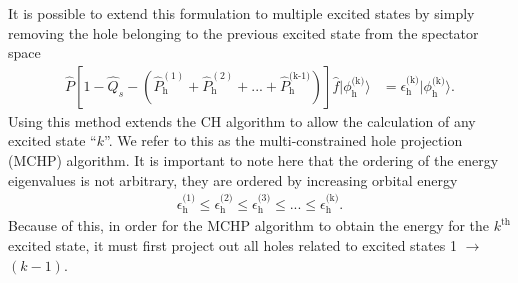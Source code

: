 \documentclass[12pt]{article}
\begin{document}
It is possible to extend this formulation to multiple excited states by simply removing the hole belonging to the previous excited state from the spectator space
\begin{align}
\hat{P}[1 - \hat{Q}_s - (\hat{P}^{(1)}_{\text{h}} + \hat{P}^{(2)}_{\text{h}} + ... +\hat{P}^{\text{(k-1)}}_{\text{h}})]\hat{f} |\phi_{\text{h}}^{\text{(k)}}\rangle &= \epsilon^{\text{(k)}}_{\text{h}} |\phi_{\text{h}}^{\text{(k)}}\rangle .
\end{align}
Using this method extends the CH algorithm to allow the calculation of any excited state ``$k$''. We refer to this as the multi-constrained hole projection (MCHP) algorithm. It is important to note here that the ordering of the energy eigenvalues is not arbitrary, they are ordered by increasing orbital energy
\begin{align}
\epsilon^{\text{(1)}}_{\text{h}} \le \epsilon^{\text{(2)}}_{\text{h}} \le \epsilon^{\text{(3)}}_{\text{h}} \le ... \le \epsilon^{\text{(k)}}_{\text{h}} .
\end{align}
Because of this, in order for the MCHP algorithm to obtain the energy for the $k^{\text{th}}$ excited state, it must first project out all holes related to excited states 1 $\rightarrow$ $(k-1)$.
\end{document}
